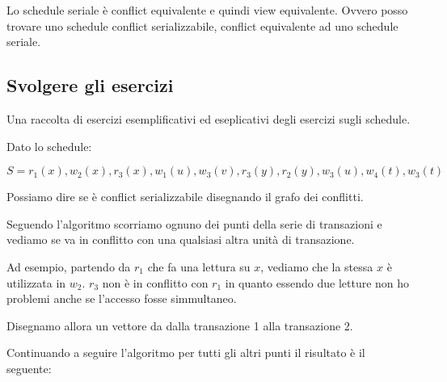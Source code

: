 Lo schedule seriale è conflict equivalente e quindi view equivalente. Ovvero posso trovare uno schedule conflict serializzabile, conflict equivalente ad uno schedule seriale.

\subsection{Svolgere gli esercizi}

Una raccolta di esercizi esemplificativi ed eseplicativi degli esercizi sugli schedule.
   

\begin{exmp}
    Dato lo schedule:

    \[S = r_1(x), w_2(x), r_3(x), w_1(u), w_3(v), r_3(y), r_2(y), w_3(u), w_4(t), w_3(t)\]

    Possiamo dire se è conflict serializzabile disegnando il grafo dei conflitti.

    Seguendo l'algoritmo scorriamo ognuno dei punti della serie di transazioni e vediamo se va in conflitto con una qualsiasi altra unità di transazione.

    Ad esempio, partendo da \textbf{$r_1$} che fa una lettura su \textbf{$x$}, vediamo che la stessa \textbf{$x$} è utilizzata in \textbf{$w_2$}. \textbf{$r_3$} non è in conflitto con \textbf{$r_1$} in quanto essendo due letture non ho problemi anche se l'accesso fosse simmultaneo.

    Disegnamo allora un vettore da dalla transazione 1 alla transazione 2.
    \begin{center}
    \end{center}

    Continuando a seguire l'algoritmo per tutti gli altri punti il risultato è il seguente:
    \begin{center}
    \end{center}


\end{exmp}
